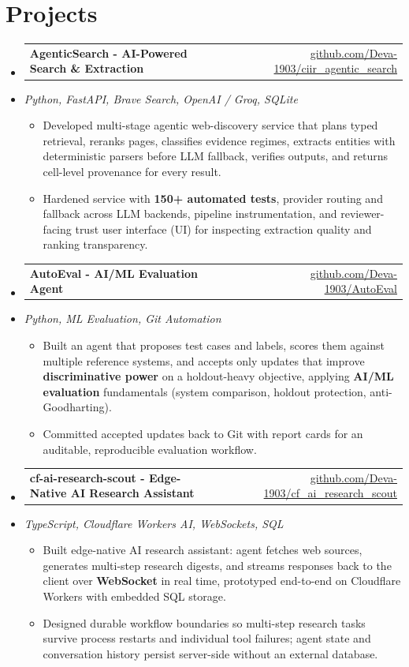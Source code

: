 \documentclass[letterpaper,10pt]{article}
\makeatletter
\newcommand{\resumeItem}[1]{
  \item\small{#1\vspace{-1pt}}
}
\newcommand{\resumeProjectHeading}[2]{
    \item
    \begin{tabular*}{0.985\textwidth}[t]{l@{\extracolsep{\fill}}r}
      \small\textbf{#1} & \small #2 \\
    \end{tabular*}\vspace{-5pt}
}
\newcommand{\resumeProjectSubheading}[1]{
  \vspace{-2pt}\item[] {\small\textcolor{ResumeSlate}{\emph{#1}}}\vspace{-3pt}
}
\newcommand{\resumeSubHeadingListStart}{\begin{itemize}[leftmargin=0.0in, label={}, itemsep=2pt, topsep=2pt]}
\newcommand{\resumeSubHeadingListEnd}{\end{itemize}}
\newcommand{\resumeItemListStart}{\begin{itemize}[leftmargin=0.18in, itemsep=2pt, topsep=1pt]}
\newcommand{\resumeItemListEnd}{\end{itemize}\vspace{-4pt}}
\makeatother
\begin{document}
\section{Projects}
\resumeSubHeadingListStart
  \resumeProjectHeading
    {AgenticSearch - AI-Powered Search \& Extraction}
    {\href{https://github.com/Deva-1903/ciir_agentic_search}{github.com/Deva-1903/ciir\_agentic\_search}}
  \resumeProjectSubheading{Python, FastAPI, Brave Search, OpenAI / Groq, SQLite}
    \resumeItemListStart
      \resumeItem{Developed multi-stage agentic web-discovery service that plans typed retrieval, reranks pages, classifies evidence regimes, extracts entities with deterministic parsers before LLM fallback, verifies outputs, and returns cell-level provenance for every result.}
      \resumeItem{Hardened service with \textbf{150+ automated tests}, provider routing and fallback across LLM backends, pipeline instrumentation, and reviewer-facing trust user interface (UI) for inspecting extraction quality and ranking transparency.}
    \resumeItemListEnd
  \resumeProjectHeading
    {AutoEval - AI/ML Evaluation Agent}
    {\href{https://github.com/Deva-1903/AutoEval}{github.com/Deva-1903/AutoEval}}
  \resumeProjectSubheading{Python, ML Evaluation, Git Automation}
    \resumeItemListStart
      \resumeItem{Built an agent that proposes test cases and labels, scores them against multiple reference systems, and accepts only updates that improve \textbf{discriminative power} on a holdout-heavy objective, applying \textbf{AI/ML evaluation} fundamentals (system comparison, holdout protection, anti-Goodharting).}
      \resumeItem{Committed accepted updates back to Git with report cards for an auditable, reproducible evaluation workflow.}
    \resumeItemListEnd
  \resumeProjectHeading
    {cf-ai-research-scout - Edge-Native AI Research Assistant}
    {\href{https://github.com/Deva-1903/cf_ai_research_scout}{github.com/Deva-1903/cf\_ai\_research\_scout}}
  \resumeProjectSubheading{TypeScript, Cloudflare Workers AI, WebSockets, SQL}
    \resumeItemListStart
      \resumeItem{Built edge-native AI research assistant: agent fetches web sources, generates multi-step research digests, and streams responses back to the client over \textbf{WebSocket} in real time, prototyped end-to-end on Cloudflare Workers with embedded SQL storage.}
      \resumeItem{Designed durable workflow boundaries so multi-step research tasks survive process restarts and individual tool failures; agent state and conversation history persist server-side without an external database.}
    \resumeItemListEnd
\resumeSubHeadingListEnd
\vspace{-4pt}
\end{document}
